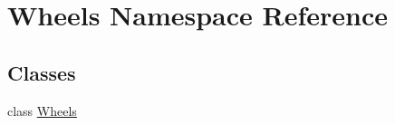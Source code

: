 \hypertarget{namespace_wheels}{}\section{Wheels Namespace Reference}
\label{namespace_wheels}
\subsection*{Classes}
\begin{DoxyCompactItemize}
\item 
class \mbox{\hyperlink{class_wheels_1_1_wheels}{Wheels}}
\end{DoxyCompactItemize}
